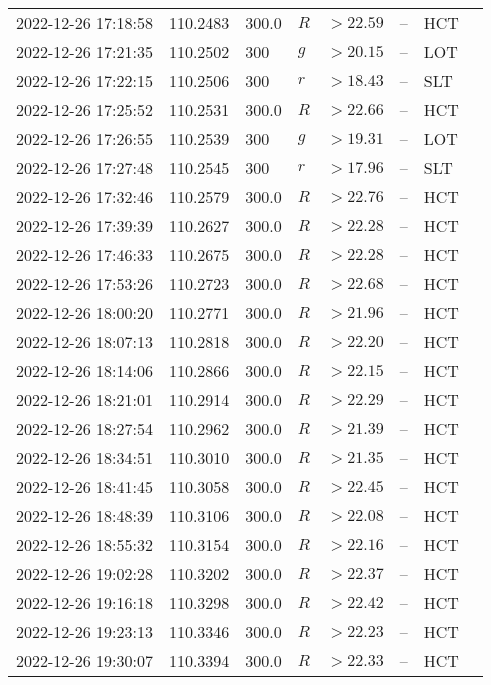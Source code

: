 \documentclass{nature_plusfigure}
\begin{document}
\begin{supplement}
\begin{center}
\begin{longtable}{llllllll}
2022-12-26 17:18:58 & 110.2483 & 300.0 & $R$ & $>22.59$ & -- & HCT &  \\ 
2022-12-26 17:21:35 & 110.2502 & 300 & $g$ & $>20.15$ & -- & LOT &  \\ 
2022-12-26 17:22:15 & 110.2506 & 300 & $r$ & $>18.43$ & -- & SLT &  \\ 
2022-12-26 17:25:52 & 110.2531 & 300.0 & $R$ & $>22.66$ & -- & HCT &  \\ 
2022-12-26 17:26:55 & 110.2539 & 300 & $g$ & $>19.31$ & -- & LOT &  \\ 
2022-12-26 17:27:48 & 110.2545 & 300 & $r$ & $>17.96$ & -- & SLT &  \\ 
2022-12-26 17:32:46 & 110.2579 & 300.0 & $R$ & $>22.76$ & -- & HCT &  \\ 
2022-12-26 17:39:39 & 110.2627 & 300.0 & $R$ & $>22.28$ & -- & HCT &  \\ 
2022-12-26 17:46:33 & 110.2675 & 300.0 & $R$ & $>22.28$ & -- & HCT &  \\ 
2022-12-26 17:53:26 & 110.2723 & 300.0 & $R$ & $>22.68$ & -- & HCT &  \\ 
2022-12-26 18:00:20 & 110.2771 & 300.0 & $R$ & $>21.96$ & -- & HCT &  \\ 
2022-12-26 18:07:13 & 110.2818 & 300.0 & $R$ & $>22.20$ & -- & HCT &  \\ 
2022-12-26 18:14:06 & 110.2866 & 300.0 & $R$ & $>22.15$ & -- & HCT &  \\ 
2022-12-26 18:21:01 & 110.2914 & 300.0 & $R$ & $>22.29$ & -- & HCT &  \\ 
2022-12-26 18:27:54 & 110.2962 & 300.0 & $R$ & $>21.39$ & -- & HCT &  \\ 
2022-12-26 18:34:51 & 110.3010 & 300.0 & $R$ & $>21.35$ & -- & HCT &  \\ 
2022-12-26 18:41:45 & 110.3058 & 300.0 & $R$ & $>22.45$ & -- & HCT &  \\ 
2022-12-26 18:48:39 & 110.3106 & 300.0 & $R$ & $>22.08$ & -- & HCT &  \\ 
2022-12-26 18:55:32 & 110.3154 & 300.0 & $R$ & $>22.16$ & -- & HCT &  \\ 
2022-12-26 19:02:28 & 110.3202 & 300.0 & $R$ & $>22.37$ & -- & HCT &  \\ 
2022-12-26 19:16:18 & 110.3298 & 300.0 & $R$ & $>22.42$ & -- & HCT &  \\ 
2022-12-26 19:23:13 & 110.3346 & 300.0 & $R$ & $>22.23$ & -- & HCT &  \\ 
2022-12-26 19:30:07 & 110.3394 & 300.0 & $R$ & $>22.33$ & -- & HCT &  \\ 

\end{longtable}
\end{center}
\end{supplement}
\end{document}
